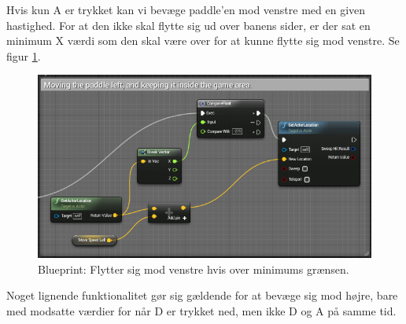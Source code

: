 Hvis kun A er trykket kan vi bevæge paddle'en mod venstre med en given hastighed. For at den ikke skal flytte sig ud over banens sider, er der sat en minimum X værdi som den skal være over for at kunne flytte sig mod venstre. Se figur \ref{dia:paddlemoveleft}. 

\begin{figure}
	\begin{center}
		\caption{Blueprint: Flytter sig mod venstre hvis over minimums grænsen.}
		\label{dia:paddlemoveleft}
		\includegraphics[width=0.98\linewidth]{pictures/blueprints/paddle-move-left}
		\end{center}
\end{figure}

Noget lignende funktionalitet gør sig gældende for at bevæge sig mod højre, bare med modsatte værdier for når D er trykket ned, men ikke D og A på samme tid.

